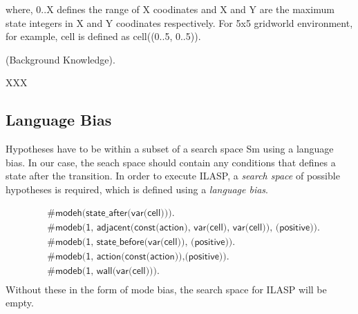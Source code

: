 where, 0..X defines the range of X coodinates and X and Y are the maximum state integers in X and Y coodinates respectively. 
For 5x5 gridworld environment, for example, cell is defined as cell((0..5, 0..5)).




\begin{examp} \normalfont (Background Knowledge).

XXX
\end{examp}

\subsection{Language Bias}
\label{subsec:language_bias}

Hypotheses have to be within a subset of a search space Sm using a language bias. In our case, the seach space should contain any conditions that defines a state after the transition.
In order to execute ILASP, a \textit{search space} of possible hypotheses is required, which is defined using a \textit{language bias}.

\begin{equation}
\begin{split}
&\textsf{\#modeh(state\_after(var(cell))).}\\
&\textsf{\#modeb(1, adjacent(const(action), var(cell), var(cell)), (positive)).} \\
&\textsf{\#modeb(1, state\_before(var(cell)), (positive)).} \\
&\textsf{\#modeb(1, action(const(action)),(positive)).} \\
&\textsf{\#modeb(1, wall(var(cell))).} \\
\end{split}
\end{equation}
Without these in the form of mode bias, the search space for ILASP will be empty.


